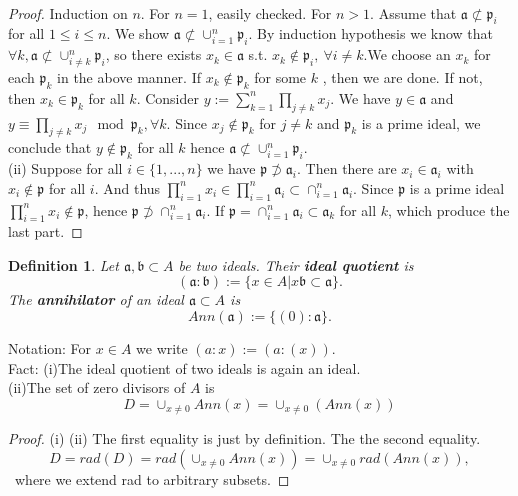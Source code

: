 \documentclass[11pt]{article}
\newtheorem{dfn}[thm]{Definition}
\newcommand{\sca}{{\mathfrak a}}
\newcommand{\scb}{{\mathfrak b}}
\newcommand{\scp}{{\mathfrak p}}
\newcommand{\notsubset}{\not \subset}
\newcommand{\notsupset}{\not \supset}
\begin{document}
 
\begin{proof}
Induction on $n$. For $n=1$, easily checked. For $n > 1$. Assume that $\sca \notsubset \scp_i$ 
for all $1\leq i\leq n$. We show $\sca\notsubset \cup_{i=1}^n\scp_i$.
By induction hypothesis we know that $\forall k,\sca\notsubset \cup_{i\neq k}^n\scp_i $, so there exists $x_k\in \sca$ s.t. $x_k\notin \scp_i,\ \forall i\neq k$.We choose an $x_k$ for each $\scp_k$ in the above manner.
If $x_k\notin \scp_k$ for some $k$ , then we are done.
If not, then $x_k\in \scp_k$ for all $k$. 
Consider $y:=\sum_{k=1}^n\prod_{j\neq k}x_j$. We have $y\in \sca$ and $y \equiv \prod_{j\neq k}x_j \mod \scp_k,\forall k$.
Since $x_j\notin \scp_k$ for $j\neq k$ and $\scp_k$ is a prime ideal, we conclude that $y\notin \scp_k$ for all $k$ hence $\sca\notsubset \cup_{i=1}^n \scp_i$.\\
(ii) Suppose for all $i\in \{1,...,n\}$ we have $\scp\notsupset \sca_i$. Then there 
are $x_i\in\sca_i $ with $x_i\notin \scp$ for all $i$. 
And thus $\prod_{i=1}^n x_i\in \prod_{i=1}^n\sca_i\subset \cap_{i=1}^n\sca_i$. 
Since $\scp$ is a prime ideal $\prod_{i=1}^n x_i\notin \scp$, hence $\scp\notsupset \cap_{i=1}^n \sca_i$.
If $\scp=\cap_{i=1}^n\sca_i\subset \sca_k$ for all $k$, which produce the last part.
\end{proof}

\begin{dfn}
Let $\sca,\scb\subset A$ be two ideals. Their \textbf{ideal quotient} is 
$$
(\sca:\scb):=\{x\in A| x\scb \subset \sca\}.
$$ 
The \textbf{annihilator} of an ideal $\sca\subset A $ is 
$$
Ann(\sca):=\{(0):\sca\}.
$$
\end{dfn}
Notation: For $x\in A$ we write $(a:x):=(a:(x))$.\\
Fact: 
(i)The ideal quotient of two ideals is again an ideal.\\
(ii)The set of zero divisors of $A$ is 
$$
D=\cup_{x\neq 0} Ann(x)=\cup_{x\neq 0}(Ann(x))
$$
\begin{proof}
(i)
(ii) The first equality is just by definition. The the second equality.
$$
D=rad(D)=rad(\cup_{x\neq 0}Ann(x))=\cup_{x\neq 0}rad(Ann(x)),
$$
 where we extend rad to arbitrary subsets.
\end{proof}
\end{document}
